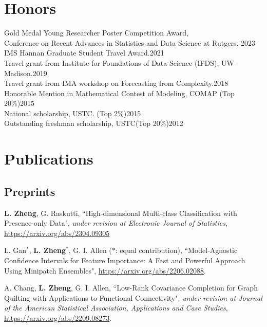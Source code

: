 \documentclass[letterpaper,11pt]{article}
\begin{document}
		\section{Honors}
	{ Gold Medal Young Researcher Poster Competition Award, \\Conference on Recent Advances in Statistics and Data Science at Rutgers. \hfill 2023\\
		
		IMS Hannan Graduate Student Travel Award.\hfill 2021\\
		Travel grant from Institute for Foundations of Data Science (IFDS), UW-Madison.\hfill                       2019\\
		Travel grant from IMA workshop on Forecasting from Complexity.\hfill                              2018\\
		Honorable Mention in Mathematical Contest of Modeling, COMAP (Top 20\%)\hfill        2015\\
		National scholarship, USTC. (Top 2\%)\hfill                                       2015\\
		Outstanding freshman scholarship, USTC(Top 20\%)\hfill                                   2012\\}
	
	\section{Publications}
	\subsection*{Preprints}
	\begin{etaremune}[start=13]
		\item {\bf L. Zheng}, G. Raskutti, ``High-dimensional Multi-class Classification with Presence-only Data", {\em under revision at Electronic Journal of Statistics},  \href{https://arxiv.org/abs/2304.09305}{https://arxiv.org/abs/2304.09305}
		\item L. Gan$^{*}$, {\bf L. Zheng}$^{*}$, G. I. Allen ($*$: equal contribution), ``Model-Agnostic Confidence Intervals for Feature Importance: A Fast and Powerful Approach Using Minipatch Ensembles", \href{https://arxiv.org/abs/2206.02088}{https://arxiv.org/abs/2206.02088}.
		\item A. Chang, {\bf L. Zheng}, G. I. Allen, ``Low-Rank Covariance Completion for Graph Quilting with Applications to Functional Connectivity". {\em under revision at Journal of the American Statistical Association, Applications and Case Studies}, \href{https://arxiv.org/abs/2209.08273}{https://arxiv.org/abs/2209.08273}.
	\end{etaremune}
\end{document}

